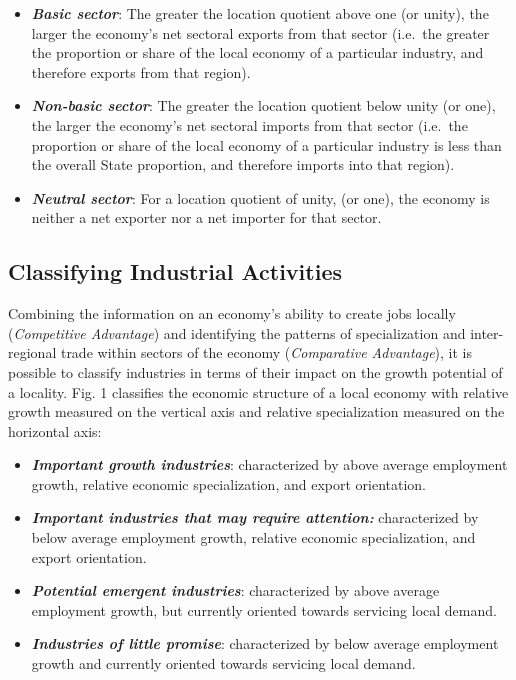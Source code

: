 \documentclass[
]{book}
\begin{document}
\begin{itemize}
\item
  \textbf{\emph{Basic sector}}: The greater the location quotient above one (or unity), the larger the economy's net sectoral exports from that sector (i.e.~the greater the proportion or share of the local economy of a particular industry, and therefore exports from that region).
\item
  \textbf{\emph{Non-basic sector}}: The greater the location quotient below unity (or one), the larger the economy's net sectoral imports from that sector (i.e.~the proportion or share of the local economy of a particular industry is less than the overall State proportion, and therefore imports into that region).
\item
  \textbf{\emph{Neutral sector}}: For a location quotient of unity, (or one), the economy is neither a net exporter nor a net importer for that sector.
\end{itemize}

\hypertarget{classifying-industrial-activities}{%
\subsection{Classifying Industrial Activities}\label{classifying-industrial-activities}}

Combining the information on an economy's ability to create jobs locally (\emph{Competitive Advantage}) and identifying the patterns of specialization and inter-regional trade within sectors of the economy (\emph{Comparative Advantage}), it is possible to classify industries in terms of their impact on the growth potential of a locality. Fig. 1 classifies the economic structure of a local economy with relative growth measured on the vertical axis and relative specialization measured on the horizontal axis:

\begin{itemize}
\item
  \textbf{\emph{Important growth industries}}: characterized by above average employment growth, relative economic specialization, and export orientation.
\item
  \textbf{\emph{Important industries that may require attention:}} characterized by below average employment growth, relative economic specialization, and export orientation.
\item
  \textbf{\emph{Potential emergent industries}}: characterized by above average employment growth, but currently oriented towards servicing local demand.
\item
  \textbf{\emph{Industries of little promise}}: characterized by below average employment growth and currently oriented towards servicing local demand.
\end{itemize}
\end{document}
